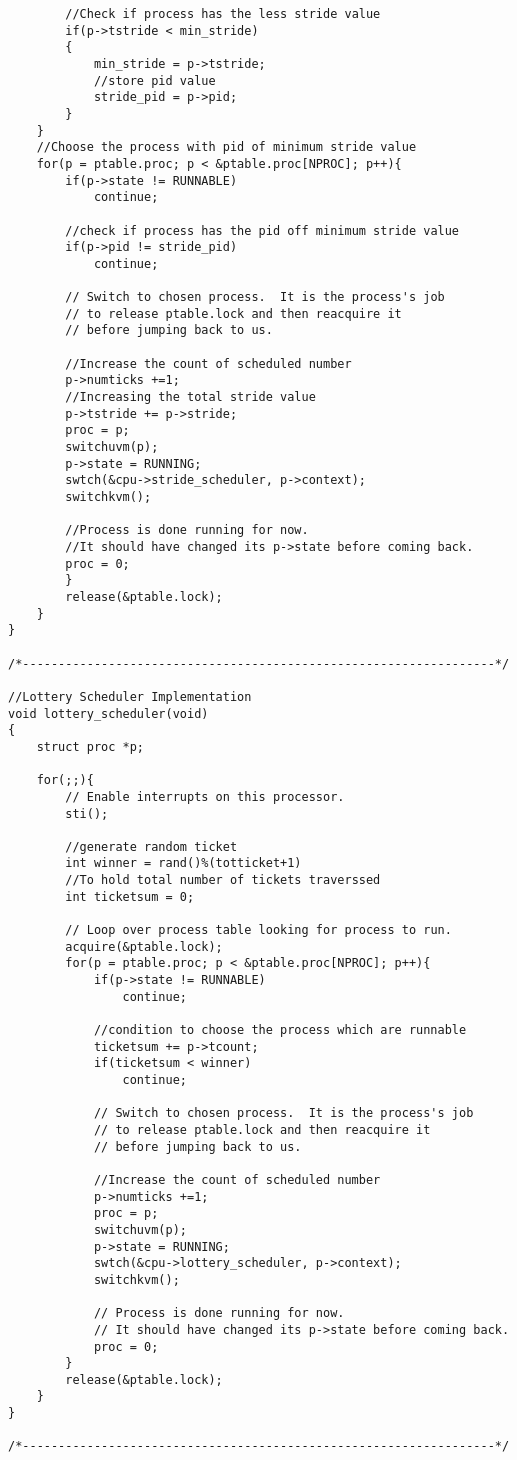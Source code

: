\documentclass[a4paper, 10pt]{article}
\begin{document}
\begin{lstlisting}
        //Check if process has the less stride value
        if(p->tstride < min_stride)
        {
            min_stride = p->tstride;
            //store pid value
            stride_pid = p->pid;
        }
    }
    //Choose the process with pid of minimum stride value
    for(p = ptable.proc; p < &ptable.proc[NPROC]; p++){
        if(p->state != RUNNABLE)
            continue;

        //check if process has the pid off minimum stride value
        if(p->pid != stride_pid)
            continue;

        // Switch to chosen process.  It is the process's job
        // to release ptable.lock and then reacquire it
        // before jumping back to us.

        //Increase the count of scheduled number
        p->numticks +=1;
        //Increasing the total stride value
        p->tstride += p->stride; 
        proc = p;
        switchuvm(p);
        p->state = RUNNING;
        swtch(&cpu->stride_scheduler, p->context);
        switchkvm();

        //Process is done running for now.
        //It should have changed its p->state before coming back.
        proc = 0;
        }
        release(&ptable.lock);
    }
}

/*------------------------------------------------------------------*/

//Lottery Scheduler Implementation
void lottery_scheduler(void)
{
    struct proc *p;

    for(;;){
        // Enable interrupts on this processor.
        sti();

        //generate random ticket
        int winner = rand()%(totticket+1)
        //To hold total number of tickets traverssed
        int ticketsum = 0;

        // Loop over process table looking for process to run.
        acquire(&ptable.lock);
        for(p = ptable.proc; p < &ptable.proc[NPROC]; p++){
            if(p->state != RUNNABLE)
                continue;

            //condition to choose the process which are runnable
            ticketsum += p->tcount;
            if(ticketsum < winner)
                continue;

            // Switch to chosen process.  It is the process's job
            // to release ptable.lock and then reacquire it
            // before jumping back to us.

            //Increase the count of scheduled number
            p->numticks +=1;
            proc = p;
            switchuvm(p);
            p->state = RUNNING;
            swtch(&cpu->lottery_scheduler, p->context);
            switchkvm();

            // Process is done running for now.
            // It should have changed its p->state before coming back.
            proc = 0;
        }
        release(&ptable.lock);
    }
}

/*------------------------------------------------------------------*/
\end{lstlisting}
\end{document}
